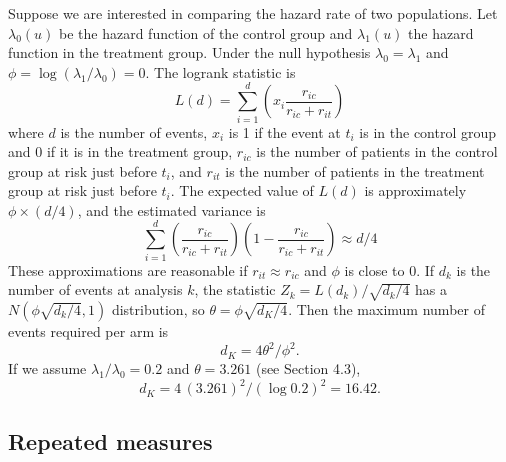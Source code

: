Suppose we are interested in comparing the hazard rate of two populations.
Let $\lambda_0(u)$ be the hazard function of the control group and
$\lambda_1(u)$ the hazard function in the treatment group.  Under the
null hypothesis $\lambda_0 = \lambda_1$ and $\phi = \log (\lambda_1
/\lambda_0) = 0$.  The logrank statistic is
\begin{displaymath}
  L(d)= \sum_{i=1}^d \left( x_i \frac{r_{ic}}{r_{ic}+r_{it}}   \right)
\end{displaymath}
where $d$ is the number of events, $x_i$ is 1 if the event at $t_i$ is in
the control group and 0 if it is in the treatment group, $r_{ic}$ is the
number of patients in the control group at risk just before $t_i$, and
$r_{it}$ is the number of patients in the treatment group at risk just
before $t_i$.  The expected value of $L(d)$ is approximately
$\phi \times (d/4)$, and the estimated variance is
\begin{displaymath}
   \sum_{i=1}^d \left(   \frac{r_{ic}}{r_{ic}+r_{it}} \right)
                \left(1- \frac{r_{ic}}{r_{ic}+r_{it}} \right)
   \approx d/4
\end{displaymath}
These approximations are reasonable if $r_{it} \approx r_{ic}$ and $\phi$
is close to 0.  If $d_k$ is the number of events at analysis $k$, the
statistic
\begin{math}
  Z_k = L(d_k)/\sqrt{d_k/4}
\end{math}
has a $N(\phi \sqrt{d_k/4}, 1)$ distribution, so
\begin{math}
  \theta = \phi \sqrt{d_K/4}.
\end{math}
Then the maximum number of events required per arm is
\begin{displaymath}
  d_K = 4 \theta^2/\phi^2.
\end{displaymath}
If we assume $\lambda_1 / \lambda_0 = 0.2$ and $\theta = 3.261$ (see
Section 4.3),
\begin{displaymath}
  d_K = 4 \, (3.261)^2 / (\log 0.2)^2 = 16.42.
\end{displaymath}


\subsection{Repeated measures}

